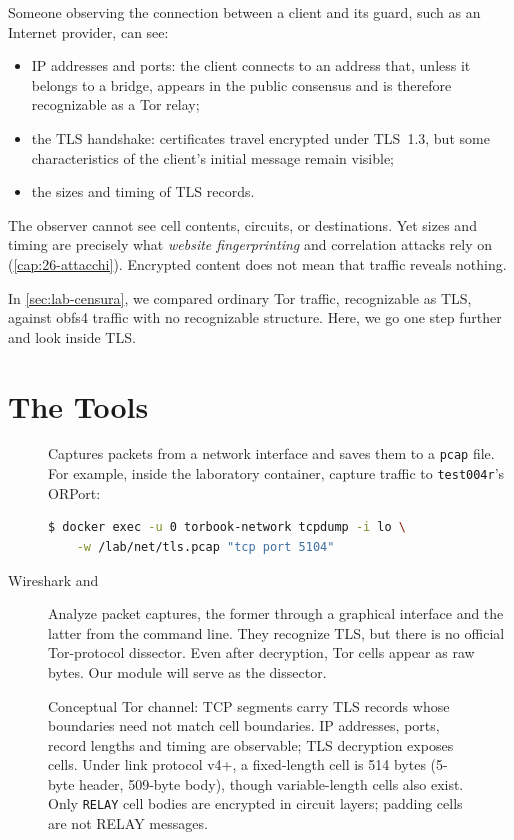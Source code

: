 Someone observing the connection between a client and its guard, such as an Internet provider, can see:
\begin{itemize}
  \item IP addresses and ports: the client connects to an address that, unless it belongs to a bridge, appears in the public consensus and is therefore recognizable as a Tor relay;
  \item the TLS handshake: certificates travel encrypted under TLS~1.3, but some characteristics of the client's initial message remain visible;
  \item the sizes and timing of TLS records.
\end{itemize}
The observer cannot see cell contents, circuits, or destinations. Yet sizes and timing are precisely what \emph{website fingerprinting} and correlation attacks rely on (\cref{cap:26-attacchi}). Encrypted content does not mean that traffic reveals nothing.

In \cref{sec:lab-censura}, we compared ordinary Tor traffic, recognizable as TLS, against obfs4 traffic with no recognizable structure. Here, we go one step further and look inside TLS.

\section{The Tools}\label{sec:traffico-strumenti}

\begin{description}
  \item[] Captures packets from a network interface and saves them to a \texttt{pcap} file. For example, inside the laboratory container, capture traffic to \texttt{test004r}'s ORPort:
\begin{lstlisting}[language=bash,numbers=none]
$ docker exec -u 0 torbook-network tcpdump -i lo \
    -w /lab/net/tls.pcap "tcp port 5104"
\end{lstlisting}
  \item[Wireshark and ] Analyze packet captures, the former through a graphical interface and the latter from the command line. They recognize TLS, but there is no official Tor-protocol dissector. Even after decryption, Tor cells appear as raw bytes. Our  module will serve as the dissector.
\end{description}

\begin{figure}[htbp]
\centering

\caption{Conceptual Tor channel: TCP segments carry TLS records whose boundaries need not match cell boundaries. IP addresses, ports, record lengths and timing are observable; TLS decryption exposes cells. Under link protocol v4+, a fixed-length cell is 514 bytes (5-byte header, 509-byte body), though variable-length cells also exist. Only \texttt{RELAY} cell bodies are encrypted in circuit layers; padding cells are not RELAY messages.}
\label{fig:incapsulamento}
\end{figure}

